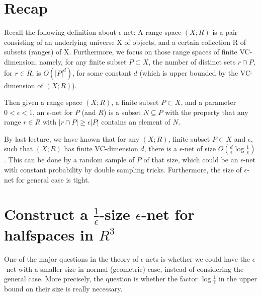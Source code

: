 \documentclass[11pt]{article}
\begin{document}
\setlength{\fboxrule}{.5mm}\setlength{\fboxsep}{1.2mm}
\newlength{\boxlength}\setlength{\boxlength}{\textwidth}
\addtolength{\boxlength}{-4mm}
\begin{center}\end{center}
\vspace{5mm}

\section{Recap}
Recall the following definition about $\epsilon$-net:
A range space $(X;R)$ is a pair consisting of an underlying universe X of objects, and a certain collection
	R of subsets (ranges) of X. 
Furthermore, we focus on those range spaces of finite  VC-dimension; namely, for any finite subset $P\subset X$, the number of distinct sets $r\cap P$,
for $r\in R$, is $O(|P|^d)$, for some constant $d$ (which is upper bounded by the VC-dimension of $(X;R)$).

Then given a range space $(X;R)$, a finite subset $P \subset X$, and a parameter $0 < \epsilon < 1$, an $\epsilon$-net for $P$ (and
$R$) is a subset $N \subseteq P$ with the property that any range $r \in R$ with $|r\cap P|\geq \epsilon|P|$ contains an element
of $N$. 

By last lecture, we have known that for any $(X;R)$, finite subset $P\subset X$ and $\epsilon$, such
	that $(X;R)$ has finite  VC-dimension $d$,
	there is a $\epsilon$-net of size $O(\frac{d}{\epsilon}\log \frac{1}{\epsilon})$. 
This can be done by a random
	sample of $P$ of that size, which could be an $\epsilon$-net with constant probability by
	double sampling tricks. 
Furthermore, the size of $\epsilon$-net for general case is tight.

\section{Construct a $\frac{1}{\epsilon}$-size $\epsilon$-net for halfspaces in $R^3$}


One of the major questions in the theory of $\epsilon$-nets is whether we could have 
	the $\epsilon$-net with a smaller size in normal (geometric) case, instead of considering the general case.
More precisely, the question is whether the factor $\log \frac{1}{\epsilon}$
	 in the upper bound on their size is really necessary.
\end{document}
